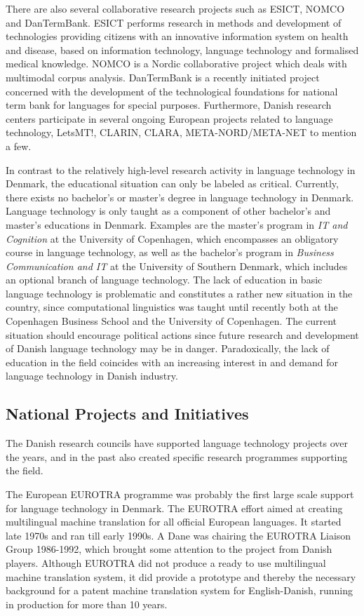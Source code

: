 \begin{multicols}{2}
There are also several collaborative research projects such as ESICT, NOMCO and DanTermBank. ESICT performs research in methods and development of technologies providing citizens with an innovative information system on health and disease, based on information technology, language technology and formalised medical knowledge. NOMCO is a Nordic collaborative project which deals with multimodal corpus analysis. DanTermBank is a recently initiated project concerned with the development of the technological foundations for national term bank for languages for special purposes. Furthermore, Danish research centers participate in several ongoing European projects related to language technology, LetsMT!, CLARIN, CLARA, META-NORD/META-NET  to mention a few.

In contrast to the relatively high-level research activity in language technology in Denmark, the educational situation can only be labeled as critical. Currently, there exists no bachelor's or master's degree in language technology in Denmark. Language technology is only taught as a component of other bachelor's and master's educations in Denmark. Examples are the master's program in {\it IT and Cognition} at the University of Copenhagen, which encompasses an obligatory course in language technology, as well as the bachelor's program in {\it Business Communication and IT} at the University of Southern Denmark, which includes an optional branch of language technology. The lack of education in basic language technology is problematic and constitutes a rather new situation in the country, since computational linguistics was taught until recently both at the Copenhagen Business School and the University of Copenhagen. The current situation should encourage political actions since future research and development of Danish language technology may be in danger. Paradoxically, the lack of education in the field coincides with an increasing interest in and demand for language technology in Danish industry. 

\subsection{National Projects and Initiatives}

 The Danish research councils have supported language technology projects over the years, and in the past also created specific research programmes supporting the field.

The European EUROTRA programme was probably the first large scale support for language technology in Denmark. The EUROTRA effort aimed at creating multilingual machine translation for all official European languages. It started late 1970s and ran till early 1990s. A Dane was chairing the EUROTRA Liaison Group 1986-1992, which brought some attention to the project from Danish players. Although EUROTRA did not produce a ready to use multilingual machine translation system, it did provide a prototype and thereby the necessary background for a patent machine translation system for English-Danish, running in production for more than 10 years.


\end{multicols}
